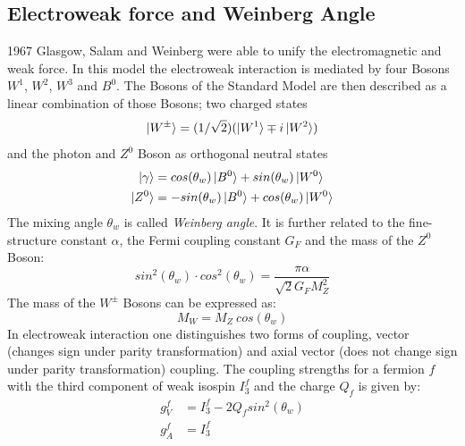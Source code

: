 \subsection{Electroweak force and Weinberg Angle}
1967 Glasgow, Salam and Weinberg were able to unify the electromagnetic and weak force. In this model the electroweak interaction is mediated by four Bosons $W^1$, $W^2$, $W^3$ and $B^0$. The Bosons of the Standard Model are then described as a linear combination of those Bosons; two charged states
\begin{equation}
\ket{W^{\pm}}=(1/\sqrt{2}) (\ket{W^1}\mp i\ket{W^2})
\end{equation}
and the photon and $Z^0$ Boson as orthogonal neutral states\cite{Grif}
\begin{equation}
\begin{aligned}
\ket{\gamma} &=  cos(\theta_w)\ket{B^0} + sin(\theta_w) \ket{W^0}\\
\ket{Z^0} &= -sin(\theta_w) \ket{B^0} + cos(\theta_w) \ket{W^0}
\end{aligned}
\end{equation}
The mixing angle $\theta_w$ is called \emph{Weinberg angle}. It is further related to the fine-structure constant  $\alpha$, the Fermi coupling constant $G_F$ and the mass of the $Z^0$ Boson\cite{muenchen}:
\begin{equation}
sin^2(\theta_w)\cdot cos^2(\theta_w) = \frac{\pi\alpha}{\sqrt{2}G_FM_Z^2}
\end{equation}
The mass of the $W^{\pm}$ Bosons can be expressed as:
\begin{equation}
M_W = M_Z~cos(\theta_w)
\end{equation}
In electroweak interaction one distinguishes two forms of coupling, vector (changes sign under parity transformation) and axial vector (does not change sign under parity transformation) coupling. The coupling strengths for a fermion $f$ with the third component of weak isospin $I^f_3$ and the charge $Q_f$ is given by\cite{muenchen}:
\begin{equation}
\begin{aligned}
g_V^f &= I^f_3-2 Q_f sin^2(\theta_w)\\
g_A^f &= I^f_3
\end{aligned}
\label{eq:principles:coupling strengths}
\end{equation}
